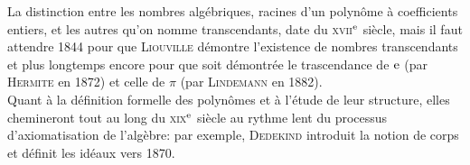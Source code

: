 {La distinction entre les nombres algébriques, racines d'un polynôme à coefficients entiers, et les autres qu'on nomme transcendants, date du \textsc{xvii}$^{\mathrm{e}}$ siècle, mais il faut attendre 1844 pour que \textsc{Liouville} démontre l'existence de nombres transcendants et plus longtemps encore pour que soit démontrée le trascendance de $\mathrm{e}$ (par \textsc{Hermite} en 1872) et celle de $\pi$ (par \textsc{Lindemann} en 1882). \\
Quant à la définition formelle des polynômes et à l'étude de leur structure, elles chemineront tout au long du \textsc{xix}$^{\mathrm{e}}$ siècle au rythme lent du processus d'axiomatisation de l'algèbre: par exemple, \textsc{Dedekind} introduit la notion de corps et définit les idéaux vers 1870.
}
